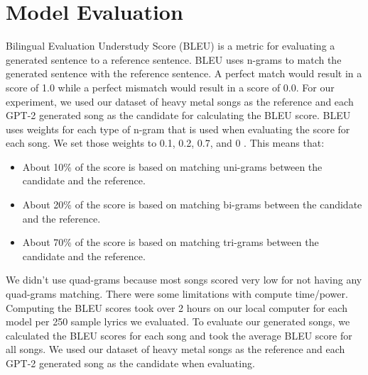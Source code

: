 \documentclass[11pt]{article}
\begin{document}
\section{Model Evaluation}

Bilingual Evaluation Understudy Score (BLEU) is a metric for evaluating a generated sentence to a reference sentence. BLEU uses n-grams to match the generated sentence with the reference sentence. A perfect match would result in a score of 1.0 while a perfect mismatch would result in a score of 0.0. For our experiment, we used our dataset of heavy metal songs as the reference and each GPT-2 generated song as the candidate for calculating the BLEU score. BLEU uses weights for each type of n-gram that is used when evaluating the score for each song. We set those weights to 0.1, 0.2, 0.7, and 0 \cite{BLEU}. This means that:
\begin{itemize}
\item About 10\% of the score is based on matching uni-grams between the candidate and the reference. 
\item About 20\% of the score is based on matching bi-grams between the candidate and the reference. 
\item About 70\% of the score is based on matching tri-grams between the candidate and the reference. 
\end{itemize}

We didn’t use quad-grams because most songs scored very low for not having any quad-grams matching. There were some limitations with compute time/power. Computing the BLEU scores took over 2 hours on our local computer for each model per 250 sample lyrics we evaluated. To evaluate our generated songs, we calculated the BLEU scores for each song and took the average BLEU score for all songs. We used our dataset of heavy metal songs as the reference and each GPT-2 generated song as the candidate when evaluating.
\end{document}
